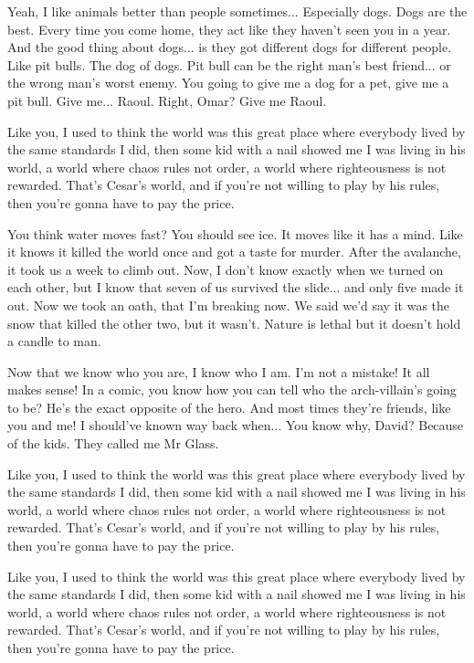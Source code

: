 \documentclass{book}
\begin{document}
Yeah, I like animals better than people sometimes... Especially dogs. Dogs are the best. Every time you come home, they act like they haven't seen you in a year. And the good thing about dogs... is they got different dogs for different people. Like pit bulls. The dog of dogs. Pit bull can be the right man's best friend... or the wrong man's worst enemy. You going to give me a dog for a pet, give me a pit bull. Give me... Raoul. Right, Omar? Give me Raoul.

Like you, I used to think the world was this great place where everybody lived by the same standards I did, then some kid with a nail showed me I was living in his world, a world where chaos rules not order, a world where righteousness is not rewarded. That's Cesar's world, and if you're not willing to play by his rules, then you're gonna have to pay the price.

You think water moves fast? You should see ice. It moves like it has a mind. Like it knows it killed the world once and got a taste for murder. After the avalanche, it took us a week to climb out. Now, I don't know exactly when we turned on each other, but I know that seven of us survived the slide... and only five made it out. Now we took an oath, that I'm breaking now. We said we'd say it was the snow that killed the other two, but it wasn't. Nature is lethal but it doesn't hold a candle to man.

Now that we know who you are, I know who I am. I'm not a mistake! It all makes sense! In a comic, you know how you can tell who the arch-villain's going to be? He's the exact opposite of the hero. And most times they're friends, like you and me! I should've known way back when... You know why, David? Because of the kids. They called me Mr Glass.

Like you, I used to think the world was this great place where everybody lived by the same standards I did, then some kid with a nail showed me I was living in his world, a world where chaos rules not order, a world where righteousness is not rewarded. That's Cesar's world, and if you're not willing to play by his rules, then you're gonna have to pay the price.

Like you, I used to think the world was this great place where everybody lived by the same standards I did, then some kid with a nail showed me I was living in his world, a world where chaos rules not order, a world where righteousness is not rewarded. That's Cesar's world, and if you're not willing to play by his rules, then you're gonna have to pay the price.
\end{document}
